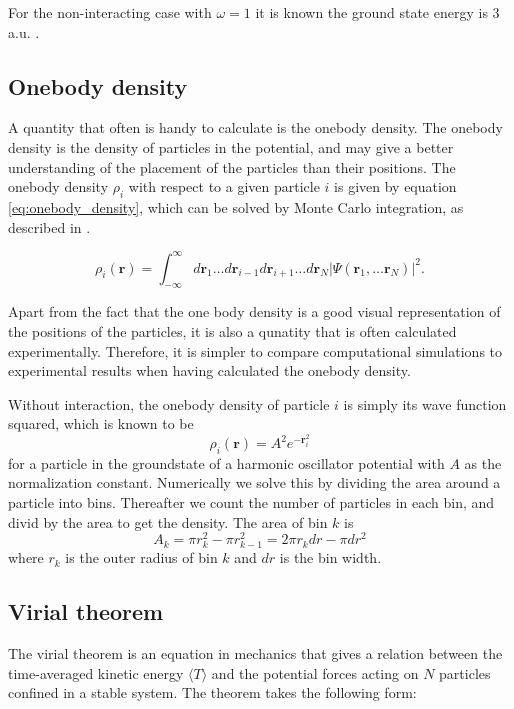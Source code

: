 \documentclass[norsk,a4paper,12pt]{article}
\begin{document}
For the non-interacting case with $\omega=1$ it is known the ground state energy is 3 a.u. \cite{Taut}. 

\subsection{Onebody density} \label{sec:onebody}
A quantity that often is handy to calculate is the onebody density. The onebody density is the density of particles in the potential, and may give a better understanding of the placement of the particles than their positions. The onebody density $\rho_i$ with respect to a given particle $i$ is given by equation \ref{eq:onebody_density}, which can be solved by Monte Carlo integration, as described in \cite{Nordhagen}.    

\begin{equation}
\label{eq:onebody_density}
\rho_i(\boldsymbol{r})=\int_{-\infty}^{\infty}d\boldsymbol{r}_1\hdots d\boldsymbol{r}_{i-1}d\boldsymbol{r}_{i+1}\hdots d\boldsymbol{r}_N |\Psi(\boldsymbol{r}_1,\hdots \boldsymbol{r}_N)|^2.
\end{equation}

Apart from the fact that the one body density is a good visual representation of the positions of the particles, it is also a qunatity that is often calculated experimentally. Therefore, it is simpler to compare computational simulations to  experimental results when having calculated the onebody density.

Without interaction, the onebody density of particle $i$ is simply its wave function squared, which is known to be
\begin{equation}
\rho_i(\boldsymbol{r})=A^2e^{-\boldsymbol{r}_i^2}
\end{equation}
for a particle in the groundstate of a harmonic oscillator potential with $A$ as the normalization constant. Numerically we solve this by dividing the area around a particle into bins. Thereafter we count the number of particles in each bin, and divid by the area to get the density. The area of bin $k$ is
\begin{equation}
A_k=\pi r_k^2-\pi r_{k-1}^2=2\pi r_kdr-\pi dr^2
\end{equation}
where $r_k$ is the outer radius of bin $k$ and $dr$ is the bin width.

\subsection{Virial theorem}
The virial theorem is an equation in mechanics that gives a relation between the time-averaged kinetic energy $\langle T \rangle$ and the potential forces acting on $N$ particles confined in a stable system. The theorem takes the following form:
\end{document}

